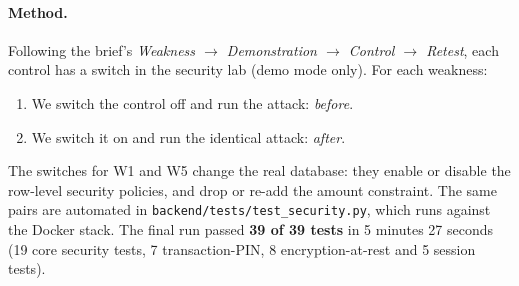 \documentclass[11pt,a4paper]{article}
\newcommand{\numtests}{39}
\newcommand{\code}[1]{\texttt{#1}}
\begin{document}
\paragraph{Method.} Following the brief's \emph{Weakness $\rightarrow$ Demonstration $\rightarrow$ Control $\rightarrow$ Retest}, each control has a switch in the security lab (demo mode only). For each weakness:
\begin{enumerate}
\item We switch the control off and run the attack: \emph{before}.
\item We switch it on and run the identical attack: \emph{after}.
\end{enumerate}
The switches for W1 and W5 change the real database: they enable or disable the row-level security policies, and drop or re-add the amount constraint. The same pairs are automated in \code{backend/tests/test\_security.py}, which runs against the Docker stack. The final run passed \textbf{\numtests{} of \numtests{} tests} in 5 minutes 27 seconds (19 core security tests, 7 transaction-PIN, 8 encryption-at-rest and 5 session tests).
\end{document}
